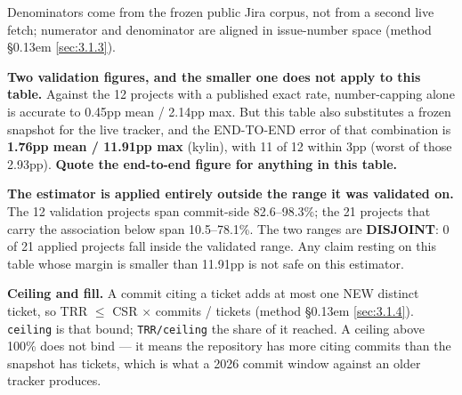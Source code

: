 \documentclass[conference]{IEEEtran}
\begin{document}
\begin{landscape}

Denominators come from the frozen public Jira corpus, not from a second live fetch; numerator and denominator are aligned in issue-number space (method \S\kern0.13em \ref{sec:3.1.3}).



\textbf{Two validation figures, and the smaller one does not apply to this table.} Against the 12 projects with a published exact rate, number-capping alone is accurate to 0.45pp mean / 2.14pp max. But this table also substitutes a frozen snapshot for the live tracker, and the END-TO-END error of that combination is \textbf{1.76pp mean / 11.91pp max} (kylin), with 11 of 12 within 3pp (worst of those 2.93pp). \textbf{Quote the end-to-end figure for anything in this table.}



\textbf{The estimator is applied entirely outside the range it was validated on.} The 12 validation projects span commit-side 82.6--98.3\%; the 21 projects that carry the association below span 10.5--78.1\%. The two ranges are \textbf{DISJOINT}: 0 of 21 applied projects fall inside the validated range. Any claim resting on this table whose margin is smaller than 11.91pp is not safe on this estimator.



\textbf{Ceiling and fill.} A commit citing a ticket adds at most one NEW distinct ticket, so TRR $\leq$ CSR $\times$ commits / tickets (method \S\kern0.13em \ref{sec:3.1.4}). \texttt{ceiling} is that bound; \texttt{TRR/\allowbreak{}ceiling} the share of it reached. A ceiling above 100\% does not bind --- it means the repository has more citing commits than the snapshot has tickets, which is what a 2026 commit window against an older tracker produces.



\begingroup\scriptsize\setlength{\tabcolsep}{3pt}

\begin{longtable}{>{\raggedright\arraybackslash}p{}>{\raggedright\arraybackslash}p{}>{\raggedright\arraybackslash}p{}>{\raggedright\arraybackslash}p{}>{\raggedright\arraybackslash}p{}>{\raggedright\arraybackslash}p{}>{\raggedright\arraybackslash}p{}>{\raggedright\arraybackslash}p{}>{\raggedright\arraybackslash}p{}>{\raggedright\arraybackslash}p{}>{\raggedright\arraybackslash}p{}}


\end{longtable}
\end{landscape}
\end{document}
